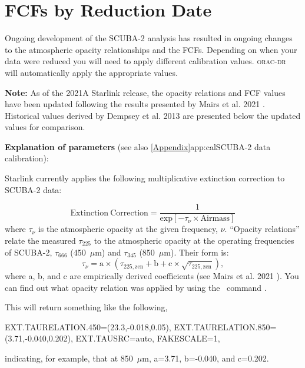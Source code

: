 \chapter{FCFs by Reduction Date}
\label{app:fcfs}

Ongoing development of the SCUBA-2 analysis has resulted in ongoing
changes to the atmospheric opacity relationships and the FCFs.
Depending on when your data were reduced you will need to apply
different calibration values. \textsc{orac-dr} will automatically apply
the appropriate values.

\textbf{Note:} As of the 2021A Starlink release, the
opacity relations and FCF values have been updated following the
results presented by Mairs et al. 2021 \cite{mairs21}. Historical values derived by Dempsey et al. 2013
\cite{dempsey12} are presented below the updated values for comparison.

\vspace{1cm}

\textbf{Explanation of parameters} (see also \cref{Appendix}{app:cal}{SCUBA-2 data calibration}):

Starlink currently applies the following multiplicative extinction correction to SCUBA-2 data:

\begin{equation}
\mathrm{Extinction\:Correction} = \frac{1}{\mathrm{exp}[-\tau_{\nu}\times\mathrm{Airmass}]}
\end{equation}
where $\tau_{\nu}$ is the atmospheric opacity at the given frequency, $\nu$. ``Opacity relations''
relate the measured $\tau_{225}$ to the atmospheric opacity at the operating frequencies of
SCUBA-2, $\tau_{666}$ (450~$\mu$m) and $\tau_{345}$ (850~$\mu$m). Their form is:
\begin{equation}
\label{eq:2021taurelation}
\tau_{\nu} = \mathrm{a}\times(\tau_{225,\mathrm{zen}} + \mathrm{b} + \mathrm{c}\times\sqrt{\tau_{225,\mathrm{zen}}}),
\end{equation}
where a, b, and c are empirically derived coefficients (see Mairs et al. 2021 \cite{mairs21}).
You can find out what opacity relation was applied by using the \Kappa\ command \hislist.

\begin{terminalv}
\end{terminalv}

This will return something like the following,
\begin{terminalv}
      EXT.TAURELATION.450=(23.3,-0.018,0.05),
      EXT.TAURELATION.850=(3.71,-0.040,0.202), EXT.TAUSRC=auto, FAKESCALE=1,
\end{terminalv}
indicating, for example, that at 850~$\mu$m, a=3.71, b=-0.040, and c=0.202.

